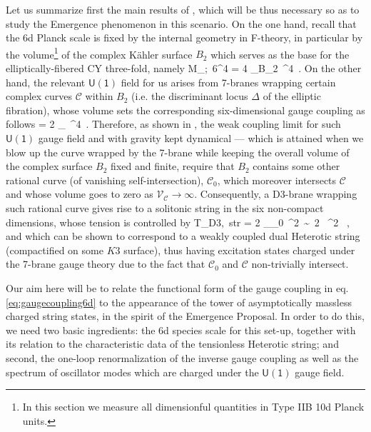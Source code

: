 Let us summarize first the main results of \cite{Lee:2018urn}, which will be thus necessary so as to study the Emergence phenomenon in this scenario. On the one hand, recall that the 6d Planck scale is fixed by the internal geometry in F-theory, in particular by the volume\footnote{In this section we measure all dimensionful quantities in Type IIB 10d Planck units.} of the complex K\"ahler surface $B_2$ which serves as the base for the elliptically-fibered CY three-fold, namely
%
\beq
\label{eq:Planckmass6d}
	M_{;\, 6}^4 = 4 \pi {}_{B_2}\, \Mpt^4\, .
\eeq
%
On the other hand, the relevant $\mathsf{U(1)}$ field for us arises from 7-branes wrapping certain complex curves $\mathcal{C}$ within $B_2$ (i.e. the discriminant locus $\Delta$ of the elliptic fibration), whose volume sets the corresponding six-dimensional gauge coupling as follows
%
\beq
\label{eq:gaugecoupling6d}
	 = 2 \pi {}_{}\, \Mpt^4\, .
\eeq
%
Therefore, as shown in \cite{Lee:2018urn, Lee:2018spm}, the weak coupling limit for such $\mathsf{U(1)}$ gauge field and with gravity kept dynamical --- which is attained when we blow up the curve wrapped by the 7-brane while keeping the overall volume of the complex surface $B_2$ fixed and finite, require that $B_2$ contains some other rational curve (of vanishing self-intersection), $\mathcal{C}_0$, which moreover intersects $\mathcal{C}$ and whose volume goes to zero as $\mathcal{V}_{\mathcal{C}} \to \infty$. Consequently, a D3-brane wrapping such rational curve gives rise to a solitonic string in the six non-compact dimensions, whose tension is controlled by 
%
\beq
\label{eq:stringtension6d}
	T_{\rm D3,\, str} = 2 \pi {}_{_0}\ \Mpt^2\, \sim\, 2 \pi {}\ \Mpt^2 \, ,
\eeq
%
and which can be shown to correspond to a weakly coupled dual Heterotic string (compactified on some $K3$ surface), thus having excitation states charged under the 7-brane gauge theory due to the fact that $\mathcal{C}_0$ and $\mathcal{C}$ non-trivially intersect.
		
Our aim here will be to relate the functional form of the gauge coupling in eq. \eqref{eq:gaugecoupling6d} to the appearance of the tower of asymptotically massless charged string states, in the spirit of the Emergence Proposal. In order to do this, we need two basic ingredients: the 6d species scale for this set-up, together with its relation to the characteristic data of the tensionless Heterotic string; and second, the one-loop renormalization of the inverse gauge coupling as well as the spectrum of oscillator modes which are charged under the $\mathsf{U(1)}$ gauge field.
		
